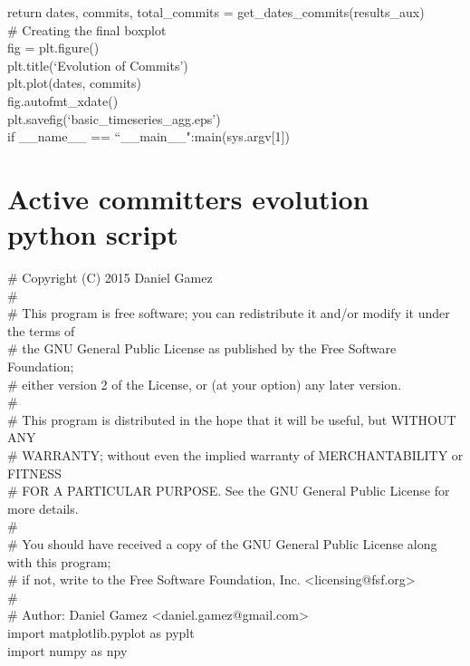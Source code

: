 \documentclass[a4paper, 12pt]{book}
\begin{document}
\noindent return dates, commits, total\_commits = get\_dates\_commits(results\_aux)\\

\noindent \# Creating the final boxplot\\
fig = plt.figure()\\
plt.title(`Evolution of Commits')\\
plt.plot(dates, commits)\\
fig.autofmt\_xdate()\\
plt.savefig(`basic\_timeseries\_agg.eps')\\

\noindent if \_\_name\_\_ == ``\_\_main\_\_":main(sys.argv[1])\\



\chapter{Active committers evolution python script}
\label{app:appendix3}

\# Copyright (C) 2015 Daniel Gamez \\
\#\\
\# This program is free software; you can redistribute it and/or modify it under the terms of \\
\# the GNU General Public License as published by the Free Software Foundation; \\
\# either version 2 of the License, or (at your option) any later version.\\
\#\\
\# This program is distributed in the hope that it will be useful, but WITHOUT ANY \\
\# WARRANTY; without even the implied warranty of MERCHANTABILITY or FITNESS \\
\# FOR A PARTICULAR PURPOSE. See the GNU General Public License for more details.\\
\#\\
\# You should have received a copy of the GNU General Public License along with this program; \\
\# if not, write to the Free Software Foundation, Inc. \textless licensing@fsf.org\textgreater \\
\#\\
\# Author: Daniel Gamez \textless daniel.gamez@gmail.com\textgreater \\

\noindent import matplotlib.pyplot as pyplt\\
\noindent import numpy as npy\\
\end{document}
